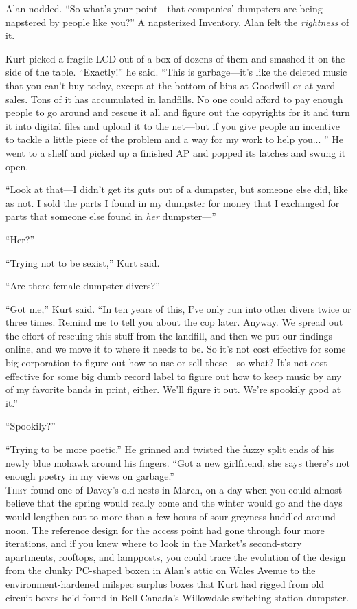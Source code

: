 \documentclass{article}
\begin{document}
Alan nodded.  ``So what's your point---that companies' dumpsters are
being napstered by people like you?'' A napsterized Inventory.  Alan
felt the \textit{rightness} of it.

Kurt picked a fragile LCD out of a box of dozens of them and smashed
it on the side of the table.  ``Exactly!'' he said.  ``This is
garbage---it's like the deleted music that you can't buy today, except
at the bottom of bins at Goodwill or at yard sales.  Tons of it has
accumulated in landfills.  No one could afford to pay enough people to
go around and rescue it all and figure out the copyrights for it and
turn it into digital files and upload it to the net---but if you give
people an incentive to tackle a little piece of the problem and a way
for my work to help you...  '' He went to a shelf and picked up a
finished AP and popped its latches and swung it open.

``Look at that---I didn't get its guts out of a dumpster, but someone
else did, like as not.  I sold the parts I found in my dumpster for
money that I exchanged for parts that someone else found in
\textit{her} dumpster---''

``Her?''

``Trying not to be sexist,'' Kurt said.

``Are there female dumpster divers?''

``Got me,'' Kurt said.  ``In ten years of this, I've only run into
other divers twice or three times.  Remind me to tell you about the
cop later.  Anyway.  We spread out the effort of rescuing this stuff
from the landfill, and then we put our findings online, and we move it
to where it needs to be.  So it's not cost effective for some big
corporation to figure out how to use or sell these---so what?  It's
not cost-effective for some big dumb record label to figure out how to
keep music by any of my favorite bands in print, either.  We'll figure
it out.  We're spookily good at it.''

``Spookily?''

``Trying to be more poetic.'' He grinned and twisted the fuzzy split
ends of his newly blue mohawk around his fingers.  ``Got a new
girlfriend, she says there's not enough poetry in my views on
garbage.''
\\
\lettrine[lines=3, lhang=.5, nindent=0pt, findent=2pt]{T}{hey} found one of Davey's old nests in March, on a day when you could
almost believe that the spring would really come and the winter would
go and the days would lengthen out to more than a few hours of sour
greyness huddled around noon.  The reference design for the access
point had gone through four more iterations, and if you knew where to
look in the Market's second-story apartments, rooftops, and lampposts,
you could trace the evolution of the design from the clunky PC-shaped
boxen in Alan's attic on Wales Avenue to the environment-hardened
milspec surplus boxes that Kurt had rigged from old circuit boxes he'd
found in Bell Canada's Willowdale switching station dumpster.
\end{document}
